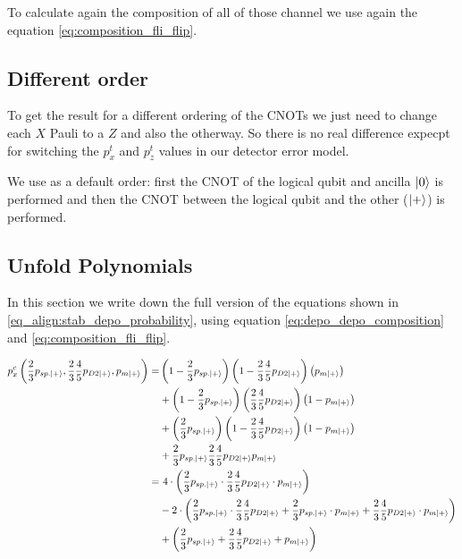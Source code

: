 To calculate again the composition of all of those channel we use again the equation \ref{eq:composition_fli_flip}.

\subsection{Different order}\label{ssec:different_order}

To get the result for a different ordering of the CNOTs we just need to change each $X$ Pauli to a $Z$ and also the otherway. 
So there is no real difference expecpt for switching the $p_x^t$ and $p_z^t$ values in our detector error model. 

We use as a default order: first the CNOT of the logical qubit and ancilla $\ket{0}$ is performed and then the CNOT between the logical qubit and the other ($\ket{+}$) is performed.

\subsection{Unfold Polynomials}\label{ssec:full_equations}

In this section we write down the full version of the equations shown in \ref{eq_align:stab_depo_probability}, using equation \ref{eq:depo_depo_composition} and \ref{eq:composition_fli_flip}.

\begin{align*}
    p^c_x \left(\frac{2}{3}p_{sp.\ket{+}}, \frac{2}{3}\frac{4}{5}p_{D2\ket{+}}, p_{m\ket{+}} \right) =  
    &   \left(1-\frac{2}{3}p_{sp.\ket{+}}\right) \left(1- \frac{2}{3}\frac{4}{5}p_{D2\ket{+}}\right) \left(p_{m\ket{+}} \right)  \\ 
    & + \left(1-\frac{2}{3}p_{sp.\ket{+}}\right) \left(\frac{2}{3}\frac{4}{5}p_{D2\ket{+}}\right) \left(1-p_{m\ket{+}} \right)\\  
    & + \left(\frac{2}{3}p_{sp.\ket{+}}\right) \left(1-\frac{2}{3}\frac{4}{5}p_{D2\ket{+}}\right) \left(1-p_{m\ket{+}} \right)\\  
    & + \frac{2}{3}p_{sp.\ket{+}}\frac{2}{3}\frac{4}{5}p_{D2\ket{+}}p_{m\ket{+}} \\  
    = & \ 4\cdot \left( \frac{2}{3}p_{sp.\ket{+}}\cdot\frac{2}{3}\frac{4}{5}p_{D2\ket{+}}\cdot p_{m\ket{+}}\right) \\
    & -2 \cdot \left(
        \frac{2}{3}p_{sp.\ket{+}}\cdot \frac{2}{3}\frac{4}{5} p_{D2\ket{+}}
        + \frac{2}{3}p_{sp.\ket{+}}\cdot p_{m\ket{+}}
        + \frac{2}{3}\frac{4}{5}p_{D2\ket{+}}\cdot p_{m\ket{+}} 
     \right) \\
    & + \left( \frac{2}{3}p_{sp.\ket{+}}+ \frac{2}{3}\frac{4}{5}p_{D2\ket{+}}+ p_{m\ket{+}}\right) \\
\end{align*}

